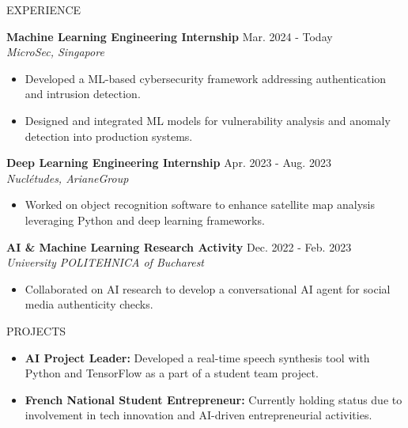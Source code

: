 \documentclass{resume} %
\begin{document}

\begin{rSection}{EXPERIENCE}

\textbf{Machine Learning Engineering Internship} \hfill {Mar. 2024 - Today} \\
\textit{MicroSec, Singapore}
\begin{itemize}
    \itemsep -3pt {} 
    \item Developed a ML-based cybersecurity framework addressing authentication and intrusion detection.
    \item Designed and integrated ML models for vulnerability analysis and anomaly detection into production systems.
\end{itemize}

\textbf{Deep Learning Engineering Internship} \hfill {Apr. 2023 - Aug. 2023} \\
\textit{Nuclétudes, ArianeGroup}
\begin{itemize}
    \itemsep -3pt {} 
    \item Worked on object recognition software to enhance satellite map analysis leveraging Python and deep learning frameworks.
\end{itemize}

\textbf{AI \& Machine Learning Research Activity} \hfill {Dec. 2022 - Feb. 2023} \\
\textit{University POLITEHNICA of Bucharest}
\begin{itemize}
    \itemsep -3pt {} 
    \item Collaborated on AI research to develop a conversational AI agent for social media authenticity checks.
\end{itemize}

\end{rSection} 


\begin{rSection}{PROJECTS}

\begin{itemize}
    \item [\textbullet] {\bf AI Project Leader:} Developed a real-time speech synthesis tool with Python and TensorFlow as a part of a student team project.
    \item [\textbullet] {\bf French National Student Entrepreneur:} Currently holding status due to involvement in tech innovation and AI-driven entrepreneurial activities. 
\end{itemize}

\end{rSection}
\end{document}
